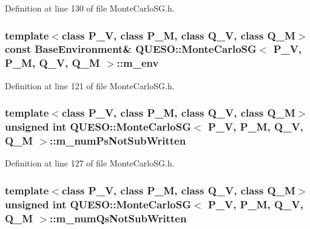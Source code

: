 Definition at line 130 of file Monte\-Carlo\-S\-G.\-h.

\hypertarget{class_q_u_e_s_o_1_1_monte_carlo_s_g_a30055a359b22cde54681679aed8ae6e7}{
\subsubsection[{m\-\_\-env}]{\setlength{\rightskip}{0pt plus 5cm}template$<$class P\-\_\-\-V, class P\-\_\-\-M, class Q\-\_\-\-V, class Q\-\_\-\-M$>$ const {\bf Base\-Environment}\& {\bf Q\-U\-E\-S\-O\-::\-Monte\-Carlo\-S\-G}$<$ P\-\_\-\-V, P\-\_\-\-M, Q\-\_\-\-V, Q\-\_\-\-M $>$\-::m\-\_\-env\hspace{0.3cm}{\ttfamily [private]}}}\label{class_q_u_e_s_o_1_1_monte_carlo_s_g_a30055a359b22cde54681679aed8ae6e7}


Definition at line 121 of file Monte\-Carlo\-S\-G.\-h.

\hypertarget{class_q_u_e_s_o_1_1_monte_carlo_s_g_a1bd46f12e850ab8d239205aafdae72af}{
\subsubsection[{m\-\_\-num\-Ps\-Not\-Sub\-Written}]{\setlength{\rightskip}{0pt plus 5cm}template$<$class P\-\_\-\-V, class P\-\_\-\-M, class Q\-\_\-\-V, class Q\-\_\-\-M$>$ unsigned int {\bf Q\-U\-E\-S\-O\-::\-Monte\-Carlo\-S\-G}$<$ P\-\_\-\-V, P\-\_\-\-M, Q\-\_\-\-V, Q\-\_\-\-M $>$\-::m\-\_\-num\-Ps\-Not\-Sub\-Written\hspace{0.3cm}{\ttfamily [private]}}}\label{class_q_u_e_s_o_1_1_monte_carlo_s_g_a1bd46f12e850ab8d239205aafdae72af}


Definition at line 127 of file Monte\-Carlo\-S\-G.\-h.

\hypertarget{class_q_u_e_s_o_1_1_monte_carlo_s_g_af1d99dc1a3384fd294da7464ba1bda5f}{
\subsubsection[{m\-\_\-num\-Qs\-Not\-Sub\-Written}]{\setlength{\rightskip}{0pt plus 5cm}template$<$class P\-\_\-\-V, class P\-\_\-\-M, class Q\-\_\-\-V, class Q\-\_\-\-M$>$ unsigned int {\bf Q\-U\-E\-S\-O\-::\-Monte\-Carlo\-S\-G}$<$ P\-\_\-\-V, P\-\_\-\-M, Q\-\_\-\-V, Q\-\_\-\-M $>$\-::m\-\_\-num\-Qs\-Not\-Sub\-Written\hspace{0.3cm}{\ttfamily [private]}}}\label{class_q_u_e_s_o_1_1_monte_carlo_s_g_af1d99dc1a3384fd294da7464ba1bda5f}


